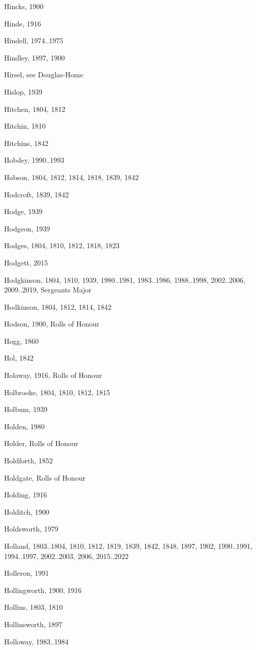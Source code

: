 {\begin{theindex}
\item Hincks, 1900
\item Hinde, 1916
\item Hindell, 1974..1975
\item Hindley, 1897, 1900
\item Hirsel, see Douglas-Home
\item Hislop, 1939
\item Hitchen, 1804, 1812
\item Hitchin, 1810
\item Hitchins, 1842
\item Hobdey, 1990..1993
\item Hobson, 1804, 1812, 1814, 1818, 1839, 1842
\item Hodcroft, 1839, 1842
\item Hodge, 1939
\item Hodgeon, 1939
\item Hodges, 1804, 1810, 1812, 1818, 1823
\item Hodgett, 2015
\item Hodgkinson, 1804, 1810, 1939, 1980..1981, 1983..1986, 1988..1998, 2002..2006, 2009..2019, Sergeants Major
\item Hodkinson, 1804, 1812, 1814, 1842
\item Hodson, 1900, Rolls of Honour
\item Hogg, 1860
\item Hol, 1842
\item Holaway, 1916, Rolls of Honour
\item Holbrooke, 1804, 1810, 1812, 1815
\item Holbum, 1939
\item Holden, 1980
\item Holder, Rolls of Honour
\item Holdforth, 1852
\item Holdgate, Rolls of Honour
\item Holding, 1916
\item Holditch, 1900
\item Holdsworth, 1979
\item Holland, 1803..1804, 1810, 1812, 1819, 1839, 1842, 1848, 1897, 1902, 1990..1991, 1994..1997, 2002..2003, 2006, 2015..2022
\item Holleron, 1991
\item Hollingworth, 1900, 1916
\item Hollins, 1803, 1810
\item Hollinsworth, 1897
\item Holloway, 1983..1984

\end{theindex}}
